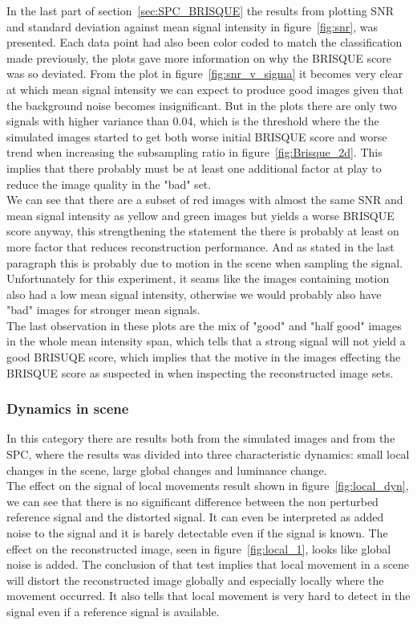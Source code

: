 In the last part of section~\ref{sec:SPC_BRISQUE} the results from plotting SNR and standard deviation against mean signal intensity in figure~\ref{fig:snr}, was presented. Each data point had also been color coded to match the classification made previously, the plots gave more information on why the BRISQUE score was so deviated. From the plot in figure~\ref{fig:snr_v_sigma} it becomes very clear at which mean signal intensity we can expect to produce good images given that the background noise becomes insignificant. But in the plots there are only two signals with higher variance than 0.04, which is the threshold where the the simulated images started to get both worse initial BRISQUE score and worse trend when increasing the subsampling ratio in figure~\ref{fig:Brisque_2d}. This implies that there probably must be at least one additional factor at play to reduce the image quality in the "bad" set.\\[0.1in]


We can see that there are a subset of red images with almost the same SNR and mean signal intensity as yellow and green images but yields a worse BRISQUE score anyway, this strengthening the statement the there is probably at least on more factor that reduces reconstruction performance. And as stated in the last paragraph this is probably due to motion in the scene when sampling the signal. Unfortunately for this experiment, it seams like the images containing motion also had a low mean signal intensity, otherwise we would probably also have "bad" images for stronger mean signals.\\[0.1in] 

The last observation in these plots are the mix of "good" and "half good" images in the whole mean intensity span, which tells that a strong signal will not yield a good BRISUQE score, which implies that the motive in the images effecting the BRISQUE score as suspected in when inspecting the reconstructed image sets.

\subsubsection{Dynamics in scene}
In this category there are results both from the simulated images and from the SPC, where the results was divided into three characteristic dynamics: small local changes in the scene, large global changes and luminance change.\\[0.1in]

The effect on the signal of local movements result shown in figure~\ref{fig:local_dyn}, we can see that there is no significant difference between the non perturbed reference signal and the distorted signal. It can even be interpreted as added noise to the signal and it is barely detectable even if the signal is known. The effect on the reconstructed image, seen in figure~\ref{fig:local_1}, looks like global noise is added. The conclusion of that test implies that local movement in a scene will distort the reconstructed image globally and especially locally where the movement occurred. It also tells that local movement is very hard to detect in the signal even if a reference signal is available.\\[0.1in]

